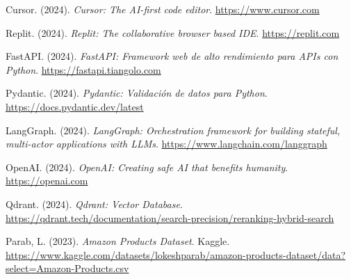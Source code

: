 \documentclass[12pt]{article}
\begin{document}










\newpage

\begin{thebibliography}{2}
    \raggedright

    Cursor. (2024). \textit{Cursor: The AI-first code editor}. \url{https://www.cursor.com}

    Replit. (2024). \textit{Replit: The collaborative browser based IDE}. \url{https://replit.com}

    FastAPI. (2024). \textit{FastAPI: Framework web de alto rendimiento para APIs con Python}. \url{https://fastapi.tiangolo.com}

    Pydantic. (2024). \textit{Pydantic: Validación de datos para Python}. \url{https://docs.pydantic.dev/latest}

    LangGraph. (2024). \textit{LangGraph: Orchestration framework for building stateful, multi-actor applications with LLMs}. \url{https://www.langchain.com/langgraph}

    OpenAI. (2024). \textit{OpenAI: Creating safe AI that benefits humanity}. \url{https://openai.com}

    Qdrant. (2024). \textit{Qdrant: Vector Database}. \url{https://qdrant.tech/documentation/search-precision/reranking-hybrid-search}

    Parab, L. (2023). \textit{Amazon Products Dataset}. Kaggle. \url{https://www.kaggle.com/datasets/lokeshparab/amazon-products-dataset/data?select=Amazon-Products.csv}

\end{thebibliography}
\end{document}
